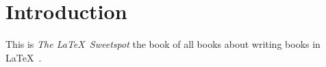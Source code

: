 \documentclass[crop=false,class=scrbook]{standalone}
\begin{document}
\chapter{Introduction}
This is \emph{The \LaTeX~Sweetspot} the book of all
books about writing books in \LaTeX~\cite{schadek:2016:tlss}.
\end{document}
